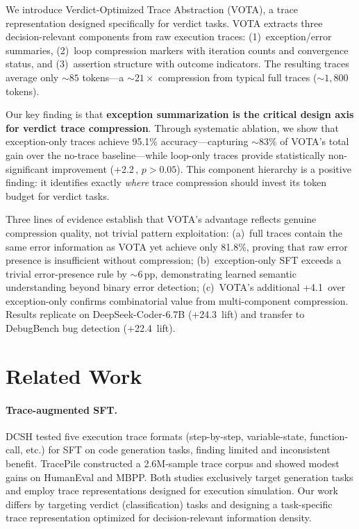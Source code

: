\documentclass[11pt]{article}
\newcommand{\vota}{\textsc{VOTA}}
\newcommand{\pp}{\,\text{pp}}
\begin{document}
We introduce Verdict-Optimized Trace Abstraction (\vota{}), a trace representation designed specifically for verdict tasks. \vota{} extracts three decision-relevant components from raw execution traces: (1)~exception/error summaries, (2)~loop compression markers with iteration counts and convergence status, and (3)~assertion structure with outcome indicators. The resulting traces average only ${\sim}85$ tokens---a ${\sim}21{\times}$ compression from typical full traces (${\sim}1{,}800$ tokens).

Our key finding is that \textbf{exception summarization is the critical design axis for verdict trace compression}. Through systematic ablation, we show that exception-only traces achieve 95.1\% accuracy---capturing ${\sim}83\%$ of \vota{}'s total gain over the no-trace baseline---while loop-only traces provide statistically non-significant improvement (+2.2\pp{}, $p > 0.05$). This component hierarchy is a positive finding: it identifies exactly \emph{where} trace compression should invest its token budget for verdict tasks.

Three lines of evidence establish that \vota{}'s advantage reflects genuine compression quality, not trivial pattern exploitation: (a)~full traces contain the same error information as \vota{} yet achieve only 81.8\%, proving that raw error presence is insufficient without compression; (b)~exception-only SFT exceeds a trivial error-presence rule by ${\sim}6\pp$, demonstrating learned semantic understanding beyond binary error detection; (c)~\vota{}'s additional +4.1\pp{} over exception-only confirms combinatorial value from multi-component compression. Results replicate on DeepSeek-Coder-6.7B (+24.3\pp{} lift) and transfer to DebugBench bug detection (+22.4\pp{} lift).

\section{Related Work}

\paragraph{Trace-augmented SFT.}
DCSH \cite{dcsh2025} tested five execution trace formats (step-by-step, variable-state, function-call, etc.) for SFT on code generation tasks, finding limited and inconsistent benefit. TracePile \cite{tracepile2025} constructed a 2.6M-sample trace corpus and showed modest gains on HumanEval and MBPP. Both studies exclusively target generation tasks and employ trace representations designed for execution simulation. Our work differs by targeting verdict (classification) tasks and designing a task-specific trace representation optimized for decision-relevant information density.
\end{document}
